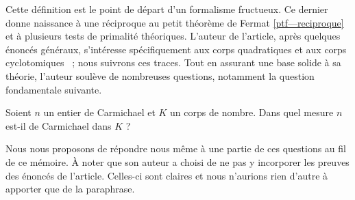 Cette définition est le point de départ d'un formalisme fructueux. Ce dernier donne naissance à une réciproque au petit théorème de Fermat \ref{ptf—reciproque} et à plusieurs tests de primalité théoriques. L'auteur de l'article, après quelques énoncés généraux, s'intéresse spécifiquement aux corps quadratiques et aux corps cyclotomiques ~; nous suivrons ces traces. Tout en assurant une base solide à sa théorie, l'auteur soulève de nombreuses questions, notamment la question fondamentale suivante.

\begin{question}\label{question-centrale}Soient $n$ un entier de Carmichael et $K$ un corps de nombre. Dans quel mesure $n$ est-il de Carmichael dans $K$ ?
\end{question}

Nous nous proposons de répondre nous même à une partie de ces questions au fil de ce mémoire. À noter que son auteur a choisi de ne pas y incorporer les preuves des énoncés de l'article. Celles-ci sont claires et nous n'aurions rien d'autre à apporter que de la paraphrase.
